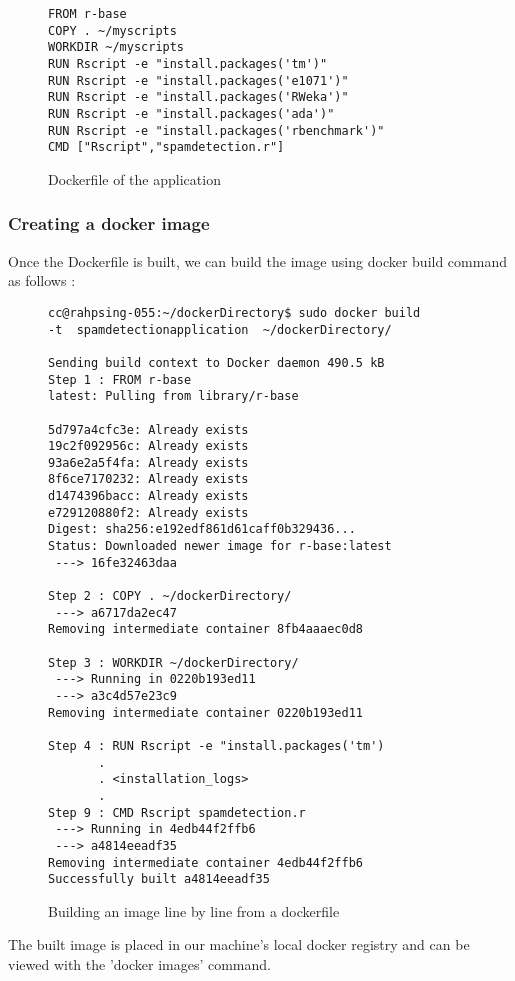 \documentclass[9pt,twocolumn,twoside]{../../styles/osajnl}
\begin{document}
\begin{figure}[H]
\begin{verbatim}
FROM r-base
COPY . ~/myscripts
WORKDIR ~/myscripts
RUN Rscript -e "install.packages('tm')"
RUN Rscript -e "install.packages('e1071')"
RUN Rscript -e "install.packages('RWeka')"
RUN Rscript -e "install.packages('ada')"
RUN Rscript -e "install.packages('rbenchmark')"
CMD ["Rscript","spamdetection.r"]
\end{verbatim}
\caption{Dockerfile of the application}
\label{Dockerfile of the application}
\end{figure}


\subsubsection{Creating a docker image}

Once the Dockerfile is built, we can build the image using docker
build command as follows :

\begin{figure}[H]
\begin{verbatim}
cc@rahpsing-055:~/dockerDirectory$ sudo docker build 
-t  spamdetectionapplication  ~/dockerDirectory/

Sending build context to Docker daemon 490.5 kB
Step 1 : FROM r-base
latest: Pulling from library/r-base

5d797a4cfc3e: Already exists 
19c2f092956c: Already exists 
93a6e2a5f4fa: Already exists 
8f6ce7170232: Already exists 
d1474396bacc: Already exists 
e729120880f2: Already exists 
Digest: sha256:e192edf861d61caff0b329436...
Status: Downloaded newer image for r-base:latest
 ---> 16fe32463daa

Step 2 : COPY . ~/dockerDirectory/
 ---> a6717da2ec47
Removing intermediate container 8fb4aaaec0d8

Step 3 : WORKDIR ~/dockerDirectory/
 ---> Running in 0220b193ed11
 ---> a3c4d57e23c9
Removing intermediate container 0220b193ed11

Step 4 : RUN Rscript -e "install.packages('tm')
       .
       . <installation_logs>
       .
Step 9 : CMD Rscript spamdetection.r
 ---> Running in 4edb44f2ffb6
 ---> a4814eeadf35
Removing intermediate container 4edb44f2ffb6
Successfully built a4814eeadf35
\end{verbatim}
\caption{Building an image line by line from a dockerfile}
\label{Building an image from a dockerfile}
\end{figure}


The built image is placed in our machine's local docker registry and
can be viewed with the 'docker images' command.
\end{document}
